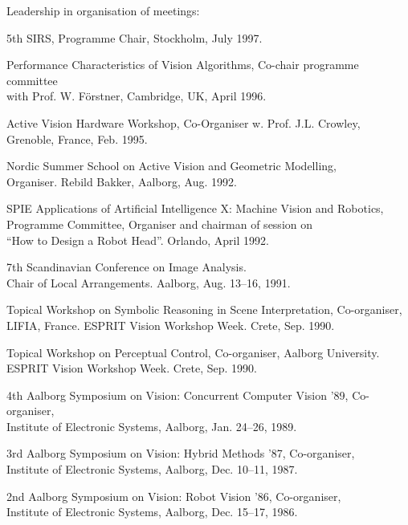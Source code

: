 \documentclass{article}
\begin{document}
\begin{cv}
\begin{cvlist}{Leadership in organisation of meetings:}
  \item 5th SIRS, Programme Chair, Stockholm, \cftdotfill{\cftdotsep} July 1997.
  \item Performance Characteristics of Vision Algorithms, Co-chair programme
  committee\\ with Prof. W. F\"orstner, Cambridge, UK, \cftdotfill{\cftdotsep}
  April 1996.
  \item Active Vision Hardware Workshop, Co-Organiser w. Prof. J.L. Crowley,
  \\Grenoble, France,\cftdotfill{\cftdotsep} Feb. 1995.
  \item Nordic Summer School on Active Vision and Geometric Modelling, \\
  Organiser. Rebild Bakker, Aalborg, \cftdotfill{\cftdotsep} Aug. 1992.
  \item SPIE Applications of Artificial Intelligence X: Machine Vision and
  Robotics, \\ Programme Committee, Organiser and chairman of session on\\ ``How
  to Design a Robot Head''. Orlando, \cftdotfill{\cftdotsep} April 1992.
  \item 7th Scandinavian Conference on Image Analysis. \\Chair of Local
  Arrangements. Aalborg, \cftdotfill{\cftdotsep} Aug. 13--16, 1991.
  \item Topical Workshop on Symbolic Reasoning in Scene Interpretation,
  Co-organiser, \\LIFIA, France. ESPRIT Vision Workshop Week. Crete,
  \cftdotfill{\cftdotsep} Sep. 1990.
  \item Topical Workshop on Perceptual Control, Co-organiser, Aalborg
  University. \\ ESPRIT Vision Workshop Week. Crete, \cftdotfill{\cftdotsep}
  Sep. 1990.
  \item 4th Aalborg Symposium on Vision: Concurrent Computer Vision '89,
  Co-organiser, \\ Institute of Electronic Systems, Aalborg,
  \cftdotfill{\cftdotsep} Jan. 24--26, 1989.
  \item 3rd Aalborg Symposium on Vision: Hybrid Methods '87, Co-organiser, \\
  Institute of Electronic Systems, Aalborg, \cftdotfill{\cftdotsep} Dec. 10--11,
  1987.
  \item 2nd Aalborg Symposium on Vision: Robot Vision '86, Co-organiser, \\
  Institute of Electronic Systems, Aalborg, \cftdotfill{\cftdotsep} Dec. 15--17,
  1986.
\end{cvlist}


\end{cv}
\end{document}
